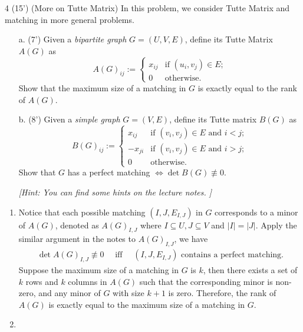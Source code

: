 \begin{question}{4 (15') (More on Tutte Matrix)} 
In this problem, we consider Tutte Matrix and matching in more general problems.
\begin{itemize}
	\item[a. (7')] Given a \textit{bipartite graph} $G = (U, V, E)$, define its Tutte Matrix $A(G)$ as 
\begin{equation*}
	A(G)_{ij}:=\begin{cases}
	x_{ij} & \text{if }(u_i,v_j)\in E;\\
	0 & \text{otherwise.}
	\end{cases}
\end{equation*}
Show that the maximum size of a matching in $G$ is exactly equal to the rank of $A(G)$.
	\item[b. (8')] Given a \textit{simple graph} $G=(V,E)$, define its Tutte matrix $B(G)$ as
\begin{equation*}
	B(G)_{ij}:=\begin{cases}
	x_{ij} & \text{if }(v_i,v_j)\in E\text{ and }i<j;\\
	-x_{ji} & \text{if }(v_i,v_j)\in E\text{ and }i>j;\\
	0 & \text{otherwise.}
	\end{cases}
\end{equation*}
Show that $G$ has a perfect matching $\Leftrightarrow\det B(G)\not\equiv 0$. 

\textit{[Hint: You can find some hints on the lecture notes. ]}

\end{itemize}
\end{question}  

\begin{answer}
	\begin{enumerate}[label=\alph*).]
		\item Notice that each possible matching $(I, J, E_{I,J})$ in $G$ corresponds to a minor of $A(G)$, denoted as $A(G)_{I,J}$ where $I\subseteq U, J\subseteq V$ and $|I|=|J|$. 
		Apply the similar argument in the notes to $A(G)_{I,J}$, we have 
		\begin{align*}
			\det A(G)_{I,J} \not \equiv 0 \quad \text{ iff } \quad \text{$(I, J, E_{I,J})$ contains a perfect matching.}
		\end{align*}
		Suppose the maximum size of a matching in $G$ is $k$, then there exists a set of $k$ rows and $k$ columns in $A(G)$ such that the corresponding minor is non-zero, and any minor of $G$ with size $k+1$ is zero. Therefore, the rank of $A(G)$ is exactly equal to the maximum size of a matching in $G$.
		\item 
		\[\]
	\end{enumerate}
\end{answer}